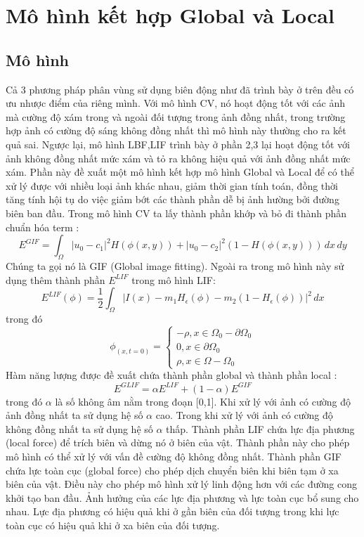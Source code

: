 \documentclass[12pt, oneside, a4]{book}
\begin{document}
\section{Mô hình kết hợp Global và Local}
\subsection{Mô hình}
Cả 3 phương pháp phân vùng sử dụng biên động như đã trình bày ở trên đều có ưu nhược điểm của riêng mình. Với mô hình CV, nó hoạt động tốt với các ảnh mà cường độ xám trong và ngoài đối tượng trong ảnh đồng nhất, trong trường hợp  ảnh có cường độ sáng không đồng nhất thì mô hình này thường cho ra kết quả sai. Ngược lại, mô hình LBF,LIF trình bày ở phần 2,3 lại hoạt động tốt với ảnh không đồng nhất mức xám và tỏ ra không hiệu quả với ảnh đồng nhất mức xám. Phần này  đề xuất một mô hình kết hợp mô hình Global và Local để có thể xử lý được với nhiều loại ảnh khác nhau, giảm thời gian tính toán, đồng thời tăng tính hội tụ do việc giảm bớt các thành phần dễ bị ảnh hường bởi đường biên ban đầu. Trong mô hình CV ta lấy thành phần khớp và bỏ đi thành phần chuẩn hóa term :
\begin{equation*}
E^{GIF}=\int_{\Omega} |u_0-c_1|^2H(\phi(x,y))+ |u_0-c_2|^2(1-H(\phi(x,y))) \,dx\,dy
\end{equation*} 
Chúng ta gọi nó là GIF (Global image fitting). Ngoài ra trong mô hình này sử dụng thêm thành phần $E^{LIF}$ trong mô hình LIF:
\begin{equation*}
E^{LIF}(\phi)=\dfrac{1}{2}\int_{\Omega}|I(x)-m_1H_{\epsilon}(\phi)-m_2(1-H_{\epsilon}(\phi))|^2\,dx
\end{equation*}
trong đó 
\begin{equation*}
\phi_(x,t=0)=\begin{cases}
-\rho, x\in \Omega_0 -\partial \Omega_0\\
0, x\in \partial \Omega_0\\
\rho, x\in \Omega- \Omega_0
\end{cases}
\end{equation*}
Hàm năng lượng được đề xuất chứa thành phần global và thành phần local :
\begin{equation}
E^{GLIF}=\alpha E^{LIF}+(1-\alpha)E^{GIF}
\end{equation}
trong đó $\alpha$ là số không âm nằm trong đoạn [0,1]. Khi xử lý với ảnh có cường độ ảnh đồng nhất ta sử dụng hệ số $\alpha$ cao. Trong khi xử lý với ảnh có cường độ không đồng nhất ta sử dụng hệ số $\alpha$ thấp. Thành phần LIF chứa lực địa phương (local force) để trích biên và dừng nó ở biên của vật. Thành phần này cho phép mô hình có thể xử lý với vấn đề cường độ không đồng nhất. Thành phần GIF chứa lực toàn cục (global force) cho phép dịch chuyển biên khi biên tạm ở xa biên của vật. Điều này cho phép mô hình xử lý linh động hơn với các đường cong khởi tạo ban đầu.
Ảnh hưởng của các lực địa phương và lực toàn cục bổ sung cho nhau. Lực địa phương có hiệu quả khi ở gần biên của đối tượng trong khi lực toàn cục có hiệu quả khi ở xa biên của đối tượng. 
\end{document}
